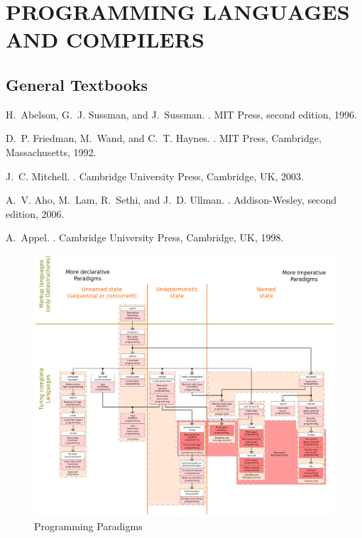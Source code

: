 \documentclass{myproc}
\begin{document}
\section{PROGRAMMING LANGUAGES AND COMPILERS}
\subsection{General Textbooks}
\bit
\w \textcolor{blue2}{H.~Abelson, G.~J. Sussman, and J.~Sussman.
.
\newblock MIT Press, second edition, 1996.}

\w D.~P. Friedman, M.~Wand, and C.~T. Haynes.
.
\newblock MIT Press, Cambridge, Massachusetts, 1992.

\w J.~C. Mitchell.
.
\newblock Cambridge University Press, Cambridge, UK, 2003.

\w A.~V. Aho, M.~Lam, R.~Sethi, and J.~D. Ullman.
.
\newblock Addison-Wesley, second edition, 2006.

\w A.~Appel.
.
\newblock Cambridge University Press, Cambridge, UK, 1998.
\eit

\begin{figure}[hbt]
\centerline{\includegraphics[width=16cm]{pics/prog-paradigms}}
\caption{Programming Paradigms}
\end{figure}
\end{document}
